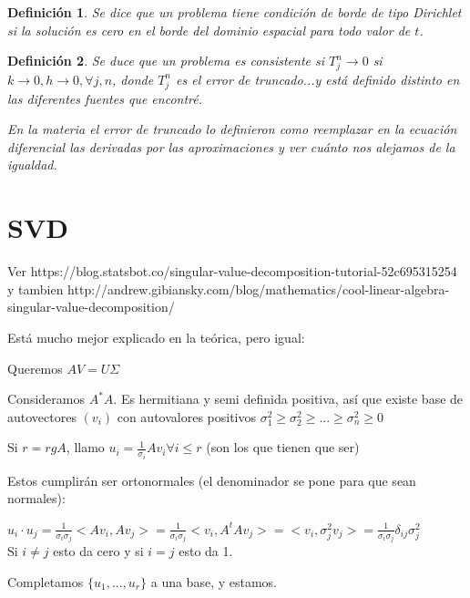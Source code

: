 \documentclass[10pt,a4paper,final]{report}
\newtheorem{definition}{Definición}
\begin{document}
\begin{definition}
	Se dice que un problema tiene condición de borde de tipo Dirichlet si la solución es cero en el borde del dominio espacial para todo valor de $t$.
\end{definition}

\begin{definition}
	Se duce que un problema es consistente si $T_j^n\to 0$ si $k\to 0, h\to 0, \forall j,n$, donde $T_j^n$ es el error de truncado...y está definido distinto en las diferentes fuentes que encontré.
	
	En la materia el error de truncado lo definieron como reemplazar en la ecuación diferencial las derivadas por las aproximaciones y ver cuánto nos alejamos de la igualdad.
\end{definition}


\section{SVD}

Ver https://blog.statsbot.co/singular-value-decomposition-tutorial-52c695315254 y tambien http://andrew.gibiansky.com/blog/mathematics/cool-linear-algebra-singular-value-decomposition/

Está mucho mejor explicado en la teórica, pero igual:

Queremos $A V = U \Sigma$



Consideramos $A^* A$. Es hermitiana y semi definida positiva, así que existe base de autovectores $(v_i)$ con autovalores positivos $\sigma_1^2 \geq \sigma_2^2 \geq ... \geq \sigma_n^2 \geq 0$

Si $r = rg A$, llamo $u_i = \frac{1}{\sigma_i} A v_i \forall i \leq r$ (son los que tienen que ser)

Estos cumplirán ser ortonormales (el denominador se pone para que sean normales):

$u_i \cdot  u_j = \frac{1}{\sigma_i \sigma_j} <Av_i, Av_j> = \frac{1}{\sigma_i \sigma_j}<v_i, A^t A v_j> = <v_i, \sigma_j^2 v_j> = \frac{1}{\sigma_i \sigma_j} \delta_{ij} \sigma_j^2$\\

Si $i \neq j$ esto da cero y si $i=j$ esto da 1.


Completamos $\{u_1,...,u_r\}$ a una base, y estamos.
\end{document}
